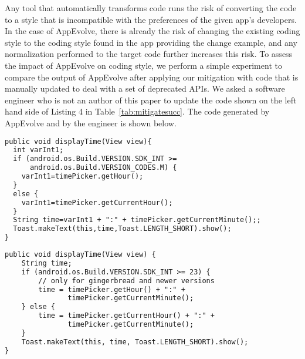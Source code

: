 Any tool that automatically transforms code runs the risk of converting the
code to a style that is incompatible with the preferences of the given
app's developers.  In the case of AppEvolve, there is already the risk of
changing the existing coding style to the coding style found in the app
providing the change example, and any normalization performed to the target
code further increases this risk.  To assess the impact of AppEvolve on
coding style, we perform a simple experiment to compare the output of
AppEvolve after applying our mitigation with code that is manually updated
to deal with a set of deprecated APIs.  We asked a software engineer who is
not an author of this paper to update the code shown on the left hand side
of Listing 4 in Table~\ref{tab:mitigatesucc}. The code generated by
AppEvolve and by the engineer is shown below.



\vspace{0.2cm}
\begin{lstlisting}[language=diff,numbers=none]
public void displayTime(View view){
  int varInt1;
  if (android.os.Build.VERSION.SDK_INT >=
      android.os.Build.VERSION_CODES.M) {
    varInt1=timePicker.getHour();
  }
  else {
    varInt1=timePicker.getCurrentHour();
  }
  String time=varInt1 + ":" + timePicker.getCurrentMinute();;
  Toast.makeText(this,time,Toast.LENGTH_SHORT).show();
}
\end{lstlisting}


\vspace{0.2cm}
\begin{lstlisting}[language=diff,numbers=none]
public void displayTime(View view) {
    String time;
    if (android.os.Build.VERSION.SDK_INT >= 23) {
        // only for gingerbread and newer versions
        time = timePicker.getHour() + ":" +
               timePicker.getCurrentMinute();
    } else {
        time = timePicker.getCurrentHour() + ":" +
               timePicker.getCurrentMinute();
    }
    Toast.makeText(this, time, Toast.LENGTH_SHORT).show();
}
\end{lstlisting}

